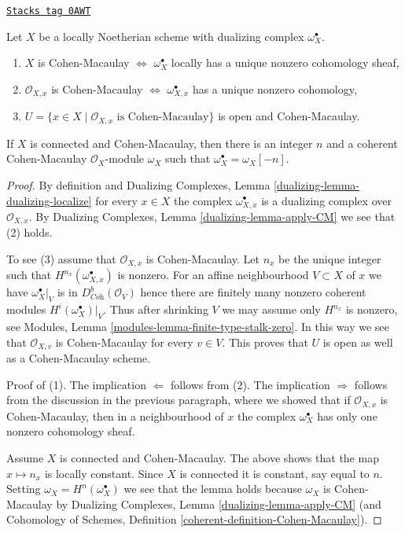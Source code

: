 \begin{lemma}
\label{duality-lemma-dualizing-module-CM-scheme}
\href{https://stacks.math.columbia.edu/tag/0AWT}{\texttt{Stacks tag 0AWT}}

Let $X$ be a locally Noetherian scheme with dualizing complex
$\omega_X^\bullet$.
\begin{enumerate}
\item $X$ is Cohen-Macaulay $\Leftrightarrow$ $\omega_X^\bullet$
locally has a unique nonzero cohomology sheaf,
\item $\mathcal{O}_{X, x}$ is Cohen-Macaulay $\Leftrightarrow$
$\omega_{X, x}^\bullet$ has a unique nonzero cohomology,
\item $U = \{x \in X \mid \mathcal{O}_{X, x}\text{ is Cohen-Macaulay}\}$
is open and Cohen-Macaulay.
\end{enumerate}
If $X$ is connected and Cohen-Macaulay, then there is an integer $n$
and a coherent Cohen-Macaulay $\mathcal{O}_X$-module $\omega_X$
such that $\omega_X^\bullet = \omega_X[-n]$.
\end{lemma}

\begin{proof}
By definition and Dualizing Complexes, Lemma
\ref{dualizing-lemma-dualizing-localize} for every $x \in X$
the complex $\omega_{X, x}^\bullet$ is a dualizing complex over
$\mathcal{O}_{X, x}$. By
Dualizing Complexes, Lemma \ref{dualizing-lemma-apply-CM}
we see that (2) holds.

\medskip\noindent
To see (3) assume that $\mathcal{O}_{X, x}$ is Cohen-Macaulay.
Let $n_x$ be the unique integer such that
$H^{n_{x}}(\omega_{X, x}^\bullet)$ is nonzero.
For an affine neighbourhood $V \subset X$
of $x$ we have $\omega_X^\bullet|_V$ is in $D^b_{\textit{Coh}}(\mathcal{O}_V)$
hence there are finitely many nonzero coherent modules
$H^i(\omega_X^\bullet)|_V$. Thus after shrinking $V$ we may assume
only $H^{n_x}$ is nonzero, see
Modules, Lemma \ref{modules-lemma-finite-type-stalk-zero}.
In this way we see that $\mathcal{O}_{X, v}$ is Cohen-Macaulay
for every $v \in V$. This proves that $U$ is open as well
as a Cohen-Macaulay scheme.

\medskip\noindent
Proof of (1). The implication $\Leftarrow$ follows from (2).
The implication $\Rightarrow$ follows from the discussion
in the previous paragraph, where we showed that if $\mathcal{O}_{X, x}$
is Cohen-Macaulay, then in a neighbourhood of $x$ the complex
$\omega_X^\bullet$ has only one nonzero cohomology sheaf.

\medskip\noindent
Assume $X$ is connected and Cohen-Macaulay. The above shows that
the map $x \mapsto n_x$ is locally constant.
Since $X$ is connected it is constant, say equal to $n$.
Setting $\omega_X = H^n(\omega_X^\bullet)$ we see that the lemma
holds because $\omega_X$ is Cohen-Macaulay by
Dualizing Complexes, Lemma \ref{dualizing-lemma-apply-CM}
(and Cohomology of Schemes, Definition
\ref{coherent-definition-Cohen-Macaulay}).
\end{proof}

